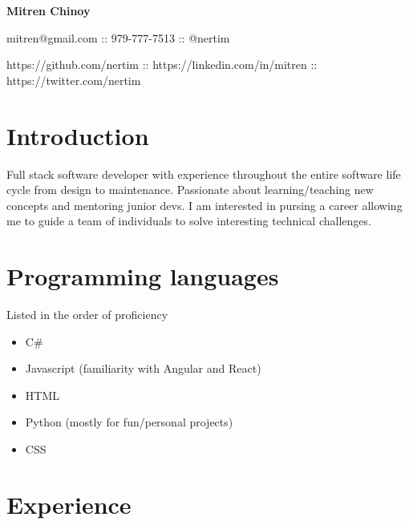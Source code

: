 \documentclass[11pt]{article}
\begin{document}
    \centerline{\textbf{\huge Mitren Chinoy}}
    \centerline{\large mitren@gmail.com :: 979-777-7513 :: @nertim}
    \centerline{\large https://github.com/nertim :: https://linkedin.com/in/mitren :: https://twitter.com/nertim}


    \section*{Introduction}

        Full stack software developer with experience throughout the entire software life cycle from design to maintenance. Passionate about learning/teaching new concepts and mentoring junior devs. I am interested in pursing a career allowing me to guide a team of individuals to solve interesting technical challenges.

    \section*{Programming languages}
    Listed in the order of proficiency
        \begin{itemize}
            \item C\#
            \item Javascript (familiarity with Angular and React)
            \item HTML
            \item Python (mostly for fun/personal projects)
            \item CSS
        \end{itemize}

    \section*{Experience}
\end{document}
